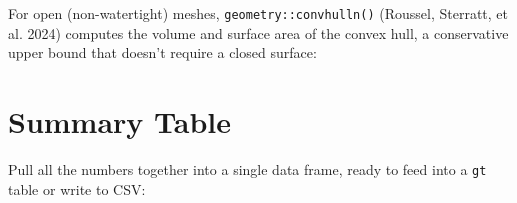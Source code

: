 \documentclass[
  11pt,
  letterpaper,
  DIV=11,
  numbers=noendperiod]{scrreprt}
\newenvironment{Shaded}{\begin{snugshade}}{\end{snugshade}}
\newcommand{\AttributeTok}[1]{\textcolor[rgb]{0.40,0.45,0.13}{#1}}
\newcommand{\CommentTok}[1]{\textcolor[rgb]{0.37,0.37,0.37}{#1}}
\newcommand{\DecValTok}[1]{\textcolor[rgb]{0.68,0.00,0.00}{#1}}
\newcommand{\FunctionTok}[1]{\textcolor[rgb]{0.28,0.35,0.67}{#1}}
\newcommand{\NormalTok}[1]{\textcolor[rgb]{0.00,0.23,0.31}{#1}}
\newcommand{\OtherTok}[1]{\textcolor[rgb]{0.00,0.23,0.31}{#1}}
\newcommand{\SpecialCharTok}[1]{\textcolor[rgb]{0.37,0.37,0.37}{#1}}
\newcommand{\StringTok}[1]{\textcolor[rgb]{0.13,0.47,0.30}{#1}}
\begin{document}
For open (non-watertight) meshes, \texttt{geometry::convhulln()}
(Roussel, Sterratt, et al. 2024) computes the volume and surface area of
the convex hull, a conservative upper bound that doesn't require a
closed surface:

\begin{Shaded}
\end{Shaded}

\section{Summary Table}\label{summary-table}

Pull all the numbers together into a single data frame, ready to feed
into a \texttt{gt} table or write to CSV:
\end{document}
